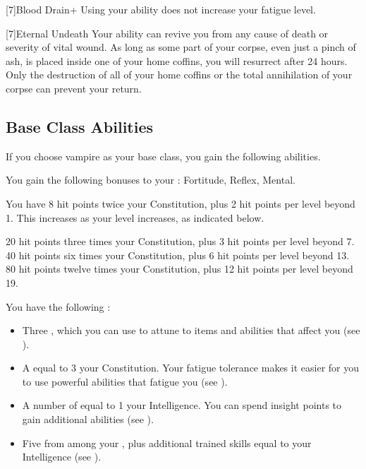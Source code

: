         [7]{Blood Drain+} Using your  ability does not increase your fatigue level.

        [7]{Eternal Undeath} Your  ability can revive you from any cause of death or severity of vital wound.
        As long as some part of your corpse, even just a pinch of ash, is placed inside one of your home coffins, you will resurrect after 24 hours.
        Only the destruction of all of your home coffins or the total annihilation of your corpse can prevent your return.

    \subsection{Base Class Abilities}
        If you choose vampire as your base class, you gain the following abilities.

        You gain the following bonuses to your :  Fortitude,  Reflex,  Mental.

            You have 8 hit points \add twice your Constitution, plus 2 hit points per level beyond 1.
            This increases as your level increases, as indicated below.
            \begin{itemize}
                 20 hit points \add three times your Constitution, plus 3 hit points per level beyond 7.
                 40 hit points \add six times your Constitution, plus 6 hit points per level beyond 13.
                 80 hit points \add twelve times your Constitution, plus 12 hit points per level beyond 19.
            \end{itemize}

         You have the following :
        \begin{itemize}
            \item Three , which you can use to attune to items and abilities that affect you (see ).
            \item A  equal to 3 \add your Constitution.
                Your fatigue tolerance makes it easier for you to use powerful abilities that fatigue you (see ).
            \item A number of  equal to 1 \add your Intelligence.
                You can spend insight points to gain additional abilities (see ).
            \item Five  from among your , plus additional trained skills equal to your Intelligence (see ).
        \end{itemize}

